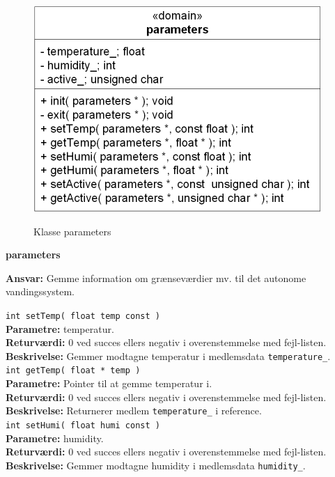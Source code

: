 
\begin{figure}[htbp] \centering
{\includegraphics[scale=1.3]{filer/design/Klassediagrammer/sw_psoc_parameters}}
\caption{Klasse parameters}
\label{fig:sw_psoc_class_parameters}
\end{figure} 

{\centering
\textbf{parameters}\par
}
\textbf{Ansvar:} Gemme information om grænseværdier mv. til det autonome vandingssystem. \

\verb+int setTemp( float temp const ) +\\
\textbf{Parametre:} temperatur. \\
\textbf{Returværdi:} 0 ved succes ellers negativ i overenstemmelse med fejl-listen. \\
\textbf{Beskrivelse:} Gemmer modtagne temperatur i medlemsdata \verb+temperature_+. \\

\verb+int getTemp( float * temp )+ \\
\textbf{Parametre:} Pointer til at gemme temperatur i. \\
\textbf{Returværdi:} 0 ved succes ellers negativ i overenstemmelse med fejl-listen. \\
\textbf{Beskrivelse:} Returnerer medlem \verb+temperature_+ i reference. \\

\verb+int setHumi( float humi const )+ \\
\textbf{Parametre:} humidity. \\
\textbf{Returværdi:} 0 ved succes ellers negativ i overenstemmelse med fejl-listen. \\
\textbf{Beskrivelse:} Gemmer modtagne humidity i medlemsdata \verb+humidity_+. \\

